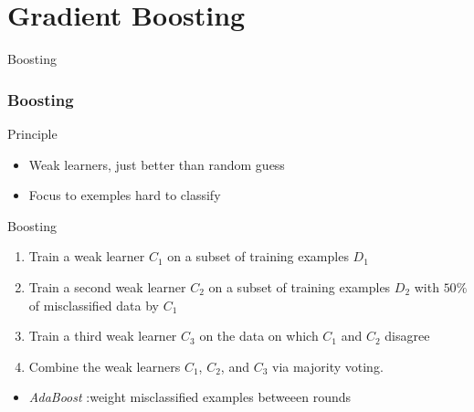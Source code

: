 \documentclass[11pt]{beamer}
\begin{document}
\section{Gradient Boosting}
\begin{frame}[plain]

  \begin{center}
    \Huge{Boosting}
    \end{center}
  
\end{frame}



\begin{frame}
  \frametitle{Boosting}
  \cite{schapire1990strength}

  \begin{block}{Principle}
    \begin{itemize}
    \item Weak learners, just better than random guess
    \item Focus to exemples hard to classify
    \end{itemize}
  \end{block}
\begin{block}{Boosting}
\begin{enumerate}
\item Train a weak learner $C_1$ on  a subset of training examples $D_1$
\item Train a second weak learner $C_2$ on a subset of training examples $D_2$
  with $50 \%$ of misclassified data by $C_1$
\item Train a third weak learner $C_3$ on the data on which $C_1$ and $C_2$ disagree
\item Combine the weak learners $C_1$, $C_2$, and $C_3$ via majority voting.
\end{enumerate}
\begin{itemize}
\item \emph{AdaBoost} :weight misclassified examples betweeen rounds  
 \end{itemize}
\end{block}
 
\end{frame}
\end{document}
